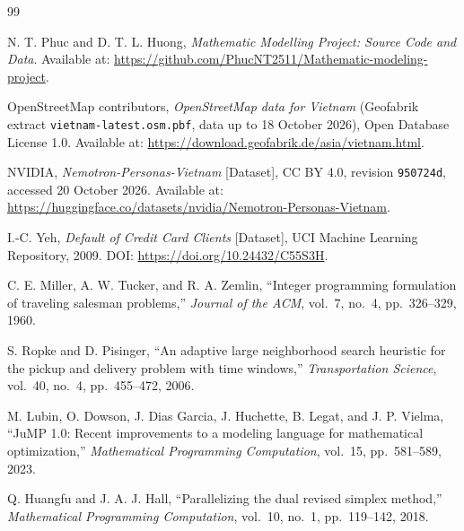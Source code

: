 \documentclass[11pt,a4paper]{article}
\begin{document}
\begingroup
\small
\begin{thebibliography}{99}
\setlength{\itemsep}{0pt}

N. T. Phuc and D. T. L. Huong,
\textit{Mathematic Modelling Project: Source Code and Data}.
Available at:
\url{https://github.com/PhucNT2511/Mathematic-modeling-project}.

OpenStreetMap contributors,
\textit{OpenStreetMap data for Vietnam} (Geofabrik extract
\texttt{vietnam-latest.osm.pbf}, data up to 18 October 2026),
Open Database License 1.0.
Available at: \url{https://download.geofabrik.de/asia/vietnam.html}.

NVIDIA,
\textit{Nemotron-Personas-Vietnam} [Dataset], CC BY 4.0,
revision \texttt{950724d}, accessed 20 October 2026.
Available at:
\url{https://huggingface.co/datasets/nvidia/Nemotron-Personas-Vietnam}.

I.-C. Yeh,
\textit{Default of Credit Card Clients} [Dataset],
UCI Machine Learning Repository, 2009.
DOI: \url{https://doi.org/10.24432/C55S3H}.

C. E. Miller, A. W. Tucker, and R. A. Zemlin,
``Integer programming formulation of traveling salesman problems,''
\textit{Journal of the ACM}, vol.~7, no.~4, pp.~326--329, 1960.

S. Ropke and D. Pisinger,
``An adaptive large neighborhood search heuristic for the pickup and
delivery problem with time windows,''
\textit{Transportation Science}, vol.~40, no.~4, pp.~455--472, 2006.

M. Lubin, O. Dowson, J. Dias Garcia, J. Huchette, B. Legat, and J. P. Vielma,
``JuMP 1.0: Recent improvements to a modeling language for mathematical
optimization,''
\textit{Mathematical Programming Computation}, vol.~15, pp.~581--589, 2023.

Q. Huangfu and J. A. J. Hall,
``Parallelizing the dual revised simplex method,''
\textit{Mathematical Programming Computation}, vol.~10, no.~1,
pp.~119--142, 2018.

\end{thebibliography}
\endgroup
\end{document}

